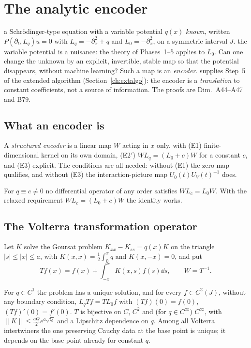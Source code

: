 \section{The analytic encoder}\label{ch:encoder}
\sectionbrief
{a Schr\"odinger-type equation with a variable potential $q(x)$ \emph{known}, written $P(\partial_t,L_q)u=0$ with $L_q=-\partial_x^2+q$ and $L_0=-\partial_x^2$, on a symmetric interval $J$.}
{the variable potential is a nuisance: the theory of Phases~1--5 applies to $L_0$. Can one change the unknown by an explicit, invertible, stable map so that the potential disappears, without machine learning? Such a map is an \emph{encoder}.}
{supplies Step~5 of the extended algorithm (Section~\ref{ch:extalgo}): the encoder is a \emph{translation} to constant coefficients, not a source of information. The proofs are Dim.~A44--A47 and B79.}

\subsection{What an encoder is}

A \emph{structured encoder} is a linear map $W$ acting in $x$ only, with (E1) finite-dimensional kernel on its own domain, (E2$'$) $WL_q=(L_0+c)W$ for a constant $c$, and (E3) explicit. The conditions are all needed: without (E1) the zero map qualifies, and without (E3) the interaction-picture map $U_0(t)U_V(t)^{-1}$ does.

\begin{proposition}\label{prop:enck0}
For $q\equiv c\ne0$ no differential operator of any order satisfies $WL_c=L_0W$. With the relaxed requirement $WL_c=(L_0+c)W$ the identity works.
\end{proposition}

\subsection{The Volterra transformation operator}

Let $K$ solve the Goursat problem $K_{xx}-K_{ss}=q(x)K$ on the triangle $|s|\le|x|\le a$, with $K(x,x)=\tfrac12\int_0^xq$ and $K(x,-x)=0$, and put
\[
Tf(x)=f(x)+\int_{-x}^xK(x,s)f(s)\dd s,\qquad W=T^{-1}.
\]

\begin{theorem}\label{thm:enc1}
For $q\in C^1$ the problem has a unique solution, and for every $f\in C^2(J)$, without any boundary condition, $L_qTf=TL_0f$ with $(Tf)(0)=f(0)$, $(Tf)'(0)=f'(0)$. $T$ is bijective on $C$, $C^2$ and (for $q\in C^\infty$) $C^\infty$, with $\|K\|\le\frac{aQ}2e^{a\sqrt Q}$ and a Lipschitz dependence on $q$. Among all Volterra intertwiners the one preserving Cauchy data at the base point is unique; it depends on the base point already for constant $q$.
\end{theorem}


